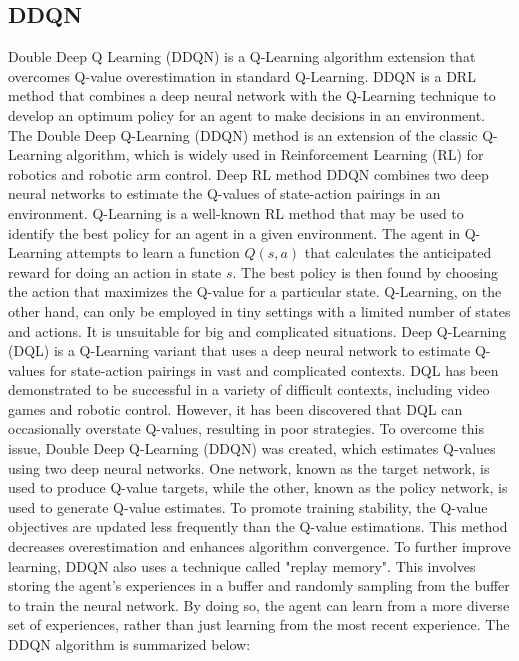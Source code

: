 \documentclass[12pt,oneside]{article}
\begin{document}
\subsection{DDQN}\label{foundations:ddqn}

Double Deep Q Learning (DDQN) \cite{42_hamdia2021efficient} is a Q-Learning algorithm extension that overcomes Q-value overestimation in standard Q-Learning. DDQN is a DRL method that combines a deep neural network with the Q-Learning technique to develop an optimum policy for an agent to make decisions in an environment.
The Double Deep Q-Learning (DDQN) method is an extension of the classic Q-Learning algorithm, which is widely used in Reinforcement Learning (RL) for robotics and robotic arm control. Deep RL method DDQN combines two deep neural networks to estimate the Q-values of state-action pairings in an environment.
Q-Learning is a well-known RL method that may be used to identify the best policy for an agent in a given environment. The agent in Q-Learning attempts to learn a function $Q(s, a)$ that calculates the anticipated reward for doing an action in state $s$. The best policy is then found by choosing the action that maximizes the Q-value for a particular state. Q-Learning, on the other hand, can only be employed in tiny settings with a limited number of states and actions. It is unsuitable for big and complicated situations.
Deep Q-Learning (DQL) is a Q-Learning variant that uses a deep neural network to estimate Q-values for state-action pairings in vast and complicated contexts. DQL has been demonstrated to be successful in a variety of difficult contexts, including video games and robotic control. However, it has been discovered that DQL can occasionally overstate Q-values, resulting in poor strategies.
To overcome this issue, Double Deep Q-Learning (DDQN) was created, which estimates Q-values using two deep neural networks. One network, known as the target network, is used to produce Q-value targets, while the other, known as the policy network, is used to generate Q-value estimates. To promote training stability, the Q-value objectives are updated less frequently than the Q-value estimations. This method decreases overestimation and enhances algorithm convergence.
To further improve learning, DDQN also uses a technique called "replay memory". This involves storing the agent's experiences in a buffer and randomly sampling from the buffer to train the neural network. By doing so, the agent can learn from a more diverse set of experiences, rather than just learning from the most recent experience. 
The DDQN algorithm is summarized below:
\end{document}
